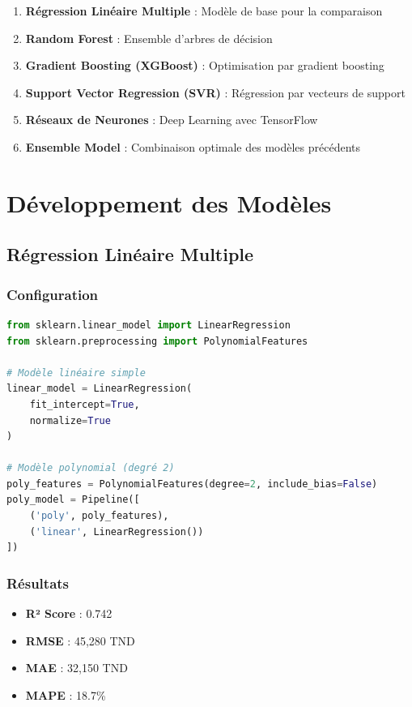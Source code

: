 \begin{enumerate}
    \item \textbf{Régression Linéaire Multiple} : Modèle de base pour la comparaison
    \item \textbf{Random Forest} : Ensemble d'arbres de décision
    \item \textbf{Gradient Boosting (XGBoost)} : Optimisation par gradient boosting
    \item \textbf{Support Vector Regression (SVR)} : Régression par vecteurs de support
    \item \textbf{Réseaux de Neurones} : Deep Learning avec TensorFlow
    \item \textbf{Ensemble Model} : Combinaison optimale des modèles précédents
\end{enumerate}

\section{Développement des Modèles}

\subsection{Régression Linéaire Multiple}

\subsubsection{Configuration}
\begin{lstlisting}[language=Python, caption=Configuration du modèle de régression linéaire]
from sklearn.linear_model import LinearRegression
from sklearn.preprocessing import PolynomialFeatures

# Modèle linéaire simple
linear_model = LinearRegression(
    fit_intercept=True,
    normalize=True
)

# Modèle polynomial (degré 2)
poly_features = PolynomialFeatures(degree=2, include_bias=False)
poly_model = Pipeline([
    ('poly', poly_features),
    ('linear', LinearRegression())
])
\end{lstlisting}

\subsubsection{Résultats}
\begin{itemize}
    \item \textbf{R² Score} : 0.742
    \item \textbf{RMSE} : 45,280 TND
    \item \textbf{MAE} : 32,150 TND
    \item \textbf{MAPE} : 18.7\%
\end{itemize}

